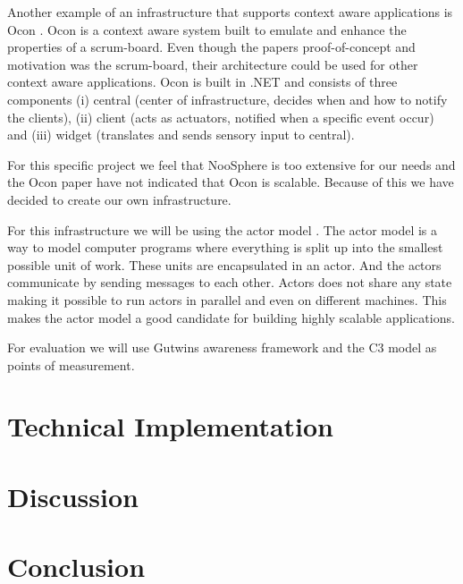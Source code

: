 \documentclass{sigchi}
\begin{document}
Another example of an infrastructure that supports context aware applications is Ocon \cite{ocon}.
Ocon is a context aware system built to emulate and enhance the properties of a scrum-board.
Even though the papers proof-of-concept and motivation was the scrum-board, their architecture could be used for other context aware applications.
Ocon is built in .NET and consists of three components (i) central (center of infrastructure, decides when and how to notify the clients), (ii) client (acts as actuators, notified when a specific event occur) and (iii) widget (translates and sends sensory input to central).

For this specific project we feel that NooSphere is too extensive for our needs and the Ocon paper have not indicated that Ocon is scalable.
Because of this we have decided to create our own infrastructure.

For this infrastructure we will be using the actor model \cite{hewitt1973universal}.
The actor model is a way to model computer programs where everything is split up into the smallest possible unit of work.
These units are encapsulated in an actor.
And the actors communicate by sending messages to each other.
Actors does not share any state making it possible to run actors in parallel and even on different machines.
This makes the actor model a good candidate for building highly scalable applications.

For evaluation we will use Gutwins awareness framework and the C3 model as points of measurement.

\section{Technical Implementation}


\section{Discussion}

\section{Conclusion}

\balance



\end{document}

